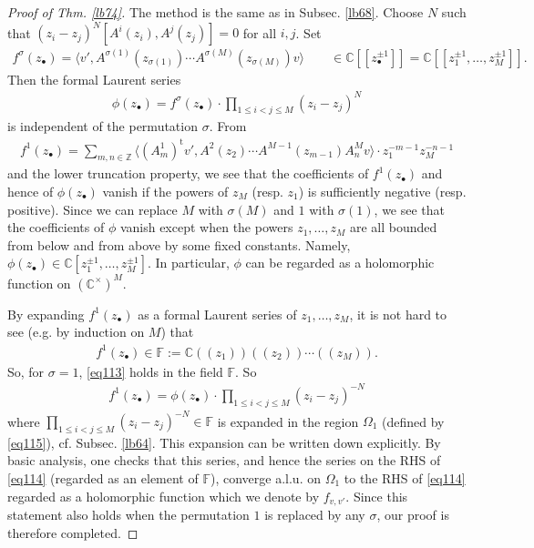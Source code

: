 \documentclass[12pt,a4paper,notitlepage]{article}
\theoremstyle{definition}
\theoremstyle{plain}
\newcommand{\tr}{\mathrm{t}} %
\newcommand{\bk}[1]{\langle {#1}\rangle}
\newcommand{\bigbk}[1]{\big\langle {#1}\big\rangle}
\newcommand{\mbb}{\mathbb}
\newcommand{\blt}{\bullet}
\newcommand{\Cbb}{\mathbb C}
\newcommand{\Zbb}{\mathbb Z}
\numberwithin{equation}{section}
\begin{document}
\begin{proof}[Proof of Thm. \ref{lb74}]
The method is the same as in Subsec. \ref{lb68}. Choose $N$ such that $(z_i-z_j)^N[A^i(z_i),A^j(z_j)]=0$ for all $i,j$. Set
\begin{align}
f^\sigma(z_\blt)=\bigbk{v',A^{\sigma(1)}(z_{\sigma(1)})\cdots A^{\sigma(M)}(z_{\sigma(M)})v}\qquad\in\Cbb[[z_\blt^{\pm1}]]=\Cbb[[z_1^{\pm1},\dots,z_M^{\pm1}]].	
\end{align}
Then the formal Laurent series
\begin{align}
\phi(z_\blt)=f^\sigma(z_\blt)	\cdot \prod_{1\leq i<j\leq M}(z_i-z_j)^N\label{eq113}
\end{align}
is independent of the permutation $\sigma$. From
\begin{align*}
f^1(z_\blt)=\sum_{m,n\in\Zbb}\bk{(A^1_m)^\tr v',A^2(z_2)\cdots A^{M-1}(z_{m-1})A^M_nv}\cdot z_1^{-m-1}z_M^{-n-1}
\end{align*}
and the lower truncation property, we see that the coefficients of $f^1(z_\blt)$ and hence of $\phi(z_\blt)$ vanish if the powers of $z_M$ (resp. $z_1$) is sufficiently negative (resp. positive). Since we can replace $M$ with $\sigma(M)$ and $1$ with $\sigma(1)$, we see that the coefficients of $\phi$ vanish except when the powers $z_1,\dots,z_M$ are all bounded from below and from above by some fixed constants. Namely, $\phi(z_\blt)\in\Cbb[z_1^{\pm1},\dots,z_M^{\pm1}]$. In particular, $\phi$ can be regarded as a holomorphic function on $(\Cbb^\times)^M$.

By expanding $f^1(z_\blt)$ as a formal Laurent series of $z_1,\dots,z_M$, it is not hard to see (e.g. by induction on $M$) that
\begin{align}
	f^1(z_\blt)\in\mbb F:=\Cbb((z_1))((z_2))\cdots((z_M)).
\end{align}
So, for $\sigma=1$, \eqref{eq113} holds in the field $\mbb F$. So
\begin{align}
f^1(z_\blt)=\phi(z_\blt)\cdot\prod_{1\leq i<j\leq M}(z_i-z_j)^{-N}	\label{eq114}
\end{align}
where $\prod_{1\leq i<j\leq M}(z_i-z_j)^{-N}\in\mbb F$ is expanded in the region $\Omega_1$ (defined by \eqref{eq115}), cf. Subsec. \ref{lb64}. This expansion can be written down explicitly. By basic analysis, one checks that this series, and hence the series on the RHS of \eqref{eq114} (regarded as an element of $\mbb F$), converge a.l.u. on $\Omega_1$ to the RHS of \eqref{eq114} regarded as a holomorphic function which we denote by $f_{v,v'}$. Since this statement also holds when the permutation $1$ is replaced by any $\sigma$, our proof is therefore completed.
\end{proof}
\end{document}
